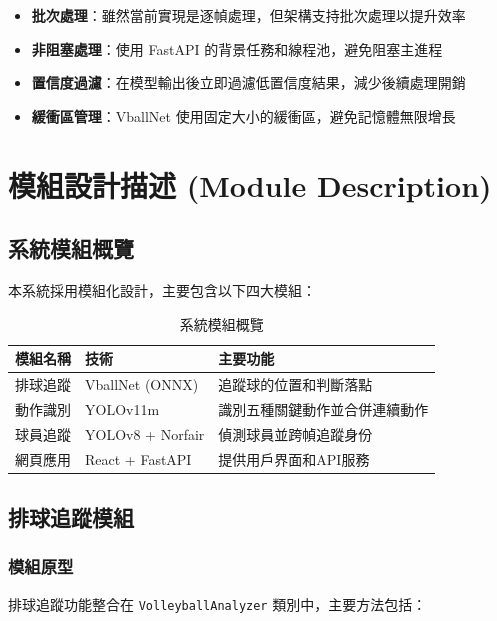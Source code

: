 \documentclass[a4paper,14pt,oneside]{article}
\begin{document}
\begin{itemize}
    \item \textbf{批次處理}：雖然當前實現是逐幀處理，但架構支持批次處理以提升效率
    \item \textbf{非阻塞處理}：使用 FastAPI 的背景任務和線程池，避免阻塞主進程
    \item \textbf{置信度過濾}：在模型輸出後立即過濾低置信度結果，減少後續處理開銷
    \item \textbf{緩衝區管理}：VballNet 使用固定大小的緩衝區，避免記憶體無限增長
\end{itemize}

\newpage
\section{模組設計描述 (Module Description)}

\subsection{系統模組概覽}

本系統採用模組化設計，主要包含以下四大模組：

\begin{table}[H]
    \centering
    \caption{系統模組概覽}
    \begin{tabular}{|l|l|p{6cm}|}
        \hline
        \textbf{模組名稱} & \textbf{技術} & \textbf{主要功能} \\
        \hline
        排球追蹤 & VballNet (ONNX) & 追蹤球的位置和判斷落點 \\
        \hline
        動作識別 & YOLOv11m & 識別五種關鍵動作並合併連續動作 \\
        \hline
        球員追蹤 & YOLOv8 + Norfair & 偵測球員並跨幀追蹤身份 \\
        \hline
        網頁應用 & React + FastAPI & 提供用戶界面和API服務 \\
        \hline
    \end{tabular}
\end{table}

\subsection{排球追蹤模組}

\subsubsection{模組原型}
排球追蹤功能整合在 \texttt{VolleyballAnalyzer} 類別中，主要方法包括：
\end{document}
